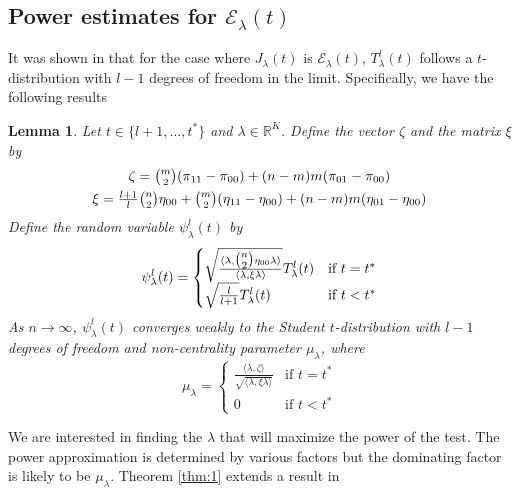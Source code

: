 \documentclass[draftcls]{IEEEtran}
\newtheorem{lemma}[theorem]{Lemma}
\theoremstyle{definition}
\begin{document}
\subsection{Power estimates for $\mathcal{E}_\lambda(t)$}
It was shown in
\cite{lee:_laten_proces_model_time_attrib_random_graph} that for the
case where $J_\lambda(t)$ is $\mathcal{E}_{\lambda}(t)$, $T_{\lambda}^{l}(t)$ 
follows a $t$-distribution with $l - 1$
degrees of freedom in the limit. Specifically, we have the following
results
\begin{lemma}
  \label{lem:1}
  Let $t \in \{l+1, \dots, t^{*}\}$ and $\lambda \in
  \mathbb{R}^{K}$. Define the vector $\zeta$ and the matrix $\xi$ by
  \begin{gather*}
    \zeta = \tbinom{m}{2}(\pi_{11} - \pi_{00}) + (n-m)m(\pi_{01} -
    \pi_{00}) \\
    \xi = \tfrac{l+1}{l}\tbinom{n}{2} \eta_{00} +
          \tbinom{m}{2}(\eta_{11} - \eta_{00}) + (n-m)m(\eta_{01} -
          \eta_{00})
  \end{gather*}
  Define the random variable $\psi^{l}_{\lambda}(t)$ by
  \begin{equation}
    \label{eq:10}
    \psi^{l}_{\lambda}(t) = \begin{cases}
      \sqrt{\frac{\langle \lambda, \tbinom{n}{2} \eta_{00}
            \lambda \rangle}{\langle \lambda, \xi
            \lambda \rangle}} T_{\lambda}^{l}(t) & \text{if $t = t^{*}$} \\
      \sqrt{\frac{l}{l + 1}} T_{\lambda}^{l}(t)& \text{if $t < t^{*}$}
      \end{cases}
  \end{equation}
As $n \rightarrow \infty$,
  $\psi^{l}_{\lambda}(t)$ converges weakly to the Student
  $t$-distribution with $l-1$ degrees of freedom and non-centrality
  parameter $\mu_{\lambda}$, where
  \begin{equation}
    \label{eq:10}
    \mu_{\lambda} = \begin{cases}
      \frac{\langle \lambda, \zeta \rangle}{\sqrt{\langle \lambda, \xi \lambda \rangle}} & \text{if $t = t^{*}$} \\
      0 & \text{if $t < t^{*}$}
    \end{cases}
  \end{equation}
\end{lemma}
We are interested in finding the $\lambda$ that will maximize the
power of the test. The power approximation is determined by various
factors but the dominating factor is likely to be
$\mu_{\lambda}$. Theorem \ref{thm:1} extends a result in
\end{document}
